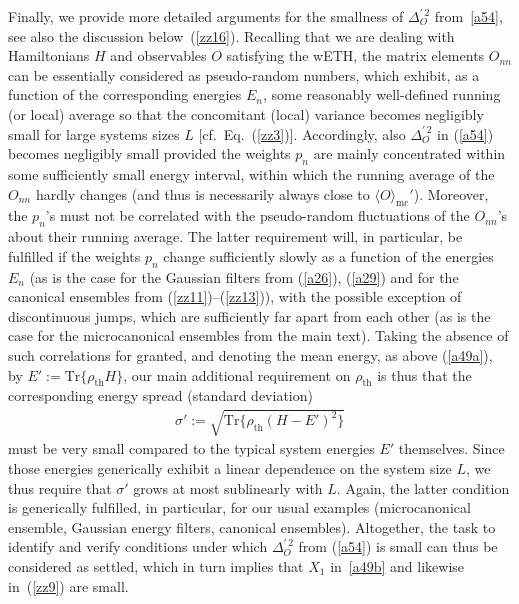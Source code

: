 \documentclass[twocolumn,aps,prb,floatfix,superscriptaddress]{revtex4-2}
\newcommand{\<}{\left\langle}	%
\renewcommand{\>}{\right\rangle}	%
\newcommand{\Pc}{\rho_{\mathrm{th}}}
\newcommand{\tr}{\mbox{Tr}}
\newcommand{\Omc}{\langle O\rangle_{\!\mathrm{mc}}}
\newcommand{\mref}[1]{\ref{#1}}
\begin{document}
Finally, we provide more detailed arguments for the smallness 
of $\Delta_O^{\prime \, 2}$ from~\eqref{a54}, see also the discussion below~(\mref{zz16}).
Recalling that we are dealing with Hamiltonians $H$ and observables $O$ satisfying the wETH,
the matrix elements $O_{nn}$ can be 
essentially considered as pseudo-random numbers, 
which exhibit, as a function of the corresponding energies
$E_n$, some reasonably well-defined running (or local)
average so that the concomitant (local) variance
becomes negligibly small for large systems sizes $L$ 
[cf.\ Eq.~(\mref{zz3})].
Accordingly, also $\Delta_O^{\prime \, 2}$ in (\ref{a54}) becomes
negligibly small provided the weights $p_n$ are
mainly concentrated within some sufficiently small 
energy interval, within which the running average
of the $O_{nn}$ hardly changes
(and thus is necessarily always close to $\Omc'$).
Moreover, the $p_n$'s must not be correlated
with the pseudo-random fluctuations of the 
$O_{nn}$'s about their running average. 
The latter requirement will, in particular, be
fulfilled if the weights $p_n$ change sufficiently
slowly as a function of the energies $E_n$ 
(as is the case for the Gaussian filters
from  (\ref{a26}), (\ref{a29}) and for the
canonical ensembles from (\mref{zz11})--(\mref{zz13})),
with the possible exception of discontinuous
jumps, which are sufficiently far apart
from each other (as is the case for the
microcanonical ensembles from %
the main text).
Taking the absence of such correlations for granted,
and denoting the mean energy, as above (\ref{a49a}), 
by $E':=\tr\{\Pc H\}$,
our main additional requirement 
on $\Pc$ is thus that the corresponding energy spread
(standard deviation)
\begin{eqnarray}
\sigma':=\sqrt{\tr\{\Pc(H-E')^2\}}
\label{a57}
\end{eqnarray}
must be very small compared to the typical system 
energies $E'$ themselves.
Since those energies generically exhibit a linear dependence
on the system size $L$, we thus require that $\sigma'$ 
grows at most sublinearly with $L$.
Again, the latter condition is generically fulfilled, in particular,
for our usual examples (microcanonical ensemble, 
Gaussian energy filters, canonical ensembles).
Altogether, the task to identify and verify conditions
under which $\Delta_O^{\prime \, 2}$ from (\ref{a54}) is small
can thus be considered as settled,
which in turn implies that $X_1$ in~\eqref{a49b} 
and likewise in~(\mref{zz9}) are
small.


\end{document}
